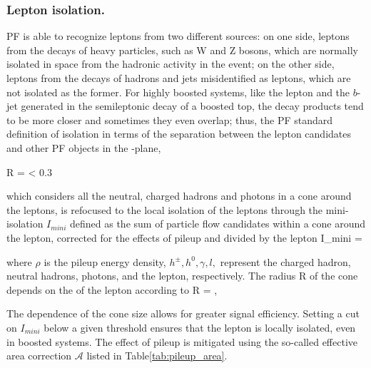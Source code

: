 \subsubsection*{Lepton isolation.}

PF is able to recognize leptons from two different sources: on one side, leptons from the decays of heavy particles, such as W and Z bosons, which are normally isolated in space from the hadronic activity in the event; on the other side, leptons from the decays of hadrons and jets misidentified as leptons, which are not isolated as the former. For highly boosted systems, like the lepton and the $b$-jet generated in the semileptonic decay of a boosted top, the decay products tend to be more closer and sometimes they even overlap; thus, the PF standard definition of isolation in terms of the separation between the lepton candidates and other PF objects in the \etac-\phic plane,

\beqn
\Delta R = < 0.3
\eeqn

\noindent which considers all the neutral, charged hadrons and photons in a cone around the leptons, is refocused to the local isolation of the leptons through the mini-isolation $I_{mini}$ \cite{i_mini} defined as the sum of particle flow candidates \pt within a cone around the lepton, corrected for the effects of pileup and divided by the lepton \pt
\beqn
I_{mini} =
\eeqn

\noindent where $\rho$ is the pileup energy density, $h^\pm, h^0, \gamma, l,$ represent the charged hadron, neutral hadrons, photons, and the lepton, respectively. The radius R of the cone depends on the \pt of the lepton according to 
\beqn
R = ,
\eeqn

The \pt dependence of the cone size allows for greater signal efficiency. Setting a cut on $I_{mini}$ below a given threshold ensures that the lepton is locally isolated, even in boosted systems. The effect of pileup is mitigated using the so-called effective area correction $\mathcal{A}$ listed in Table\ref{tab:pileup_area}. 


